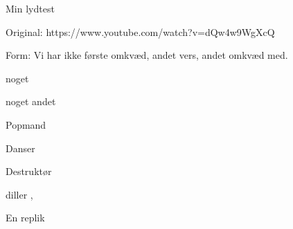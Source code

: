 \begin{Sang}[noget]{Min lydtest}
\begin{Bandkommentar}
  Original: https://www.youtube.com/watch?v=dQw4w9WgXcQ

  Form: Vi har ikke første omkvæd, andet vers, andet omkvæd med.
\end{Bandkommentar}

\begin{Lydeffekter}
  \item noget
  \item noget andet
\end{Lydeffekter}

\begin{Persongalleri}
  \item Popmand
  \item Danser
  \item Destruktør
\end{Persongalleri}



\begin{Regi}
  diller  , \fuldscene{}
\end{Regi}

\begin{Replik}[B]
   En replik
\end{Replik}

\end{Sang}

